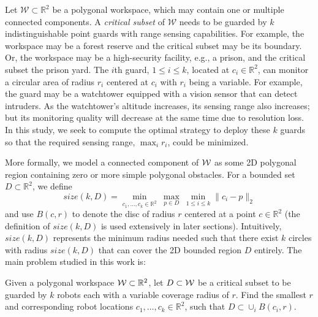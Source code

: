Let $\mathcal{W}\subset \mathbb{R}^2$ be a 
polygonal workspace, which may contain one or multiple connected components. 
A {\em critical subset} of $\mathcal{W}$ needs to be guarded by $k$ 
indistinguishable point guards with range sensing capabilities. For 
example, the workspace may be a forest reserve and the critical subset 
may be its boundary. Or, the workspace may be a high-security facility, 
e.g., a prison, and the critical subset the prison yard. The $i$th 
guard, $1\le i\le k$, located at $c_i \in \mathbb{R}^2$, can monitor a circular 
area of radius $r_i$ centered at $c_i$ with $r_i$ being a variable. For 
example, the guard may be a watchtower equipped with a vision sensor 
that can detect intruders. As the watchtower's altitude increases, 
its sensing range also increases; but its monitoring quality will 
decrease at the same time due to resolution loss. In this study, we seek 
to compute the optimal strategy to deploy these $k$ guards so that the 
required sensing range, $\max_i r_i$, could be minimized. 

More formally, we model a connected component of $\mathcal W$ as some 2D polygonal region
containing zero or more simple polygonal obstacles. 
For a bounded set $D \subset \mathbb{R}^2$, we define
\begin{equation*}
size(k, D) = \min_{c_1, \dots, c_k\in \mathbb{R}^2}\ \max_{p\in D}\ \min_{1\leq i\leq k} \lVert c_i - p \rVert_2 
\end{equation*}
and use $B(c, r)$ to denote the disc of radius $r$ centered at a point $c 
\in \mathbb{R}^2$ (the definition of $size(k, D)$ is used extensively in later 
sections). 
Intuitively, $size(k,D)$ represents the minimum radius needed such that there
exist $k$ circles with radius $size(k, D)$ that can cover the 2D bounded region $D$ entirely.
The main problem studied in this work is:

\begin{problem}
Given a polygonal workspace $\mathcal W \subset \mathbb{R}^2$, let $D \subset \mathcal W$ be a 
critical subset to be guarded by $k$ robots each with a variable coverage radius of $r$. Find 
the smallest $r$ and corresponding robot locations $c_1, \dots, c_k\in \mathbb{R}^2$, such that $D \subset \cup_i B(c_i, r)$.
\end{problem}

